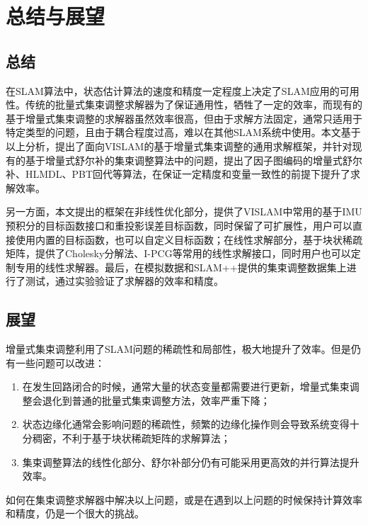 \chapter{总结与展望}\label{ch:con}

\section{总结}

在SLAM算法中，状态估计算法的速度和精度一定程度上决定了SLAM应用的可用性。传统的批量式集束调整求解器为了保证通用性，牺牲了一定的效率，而现有的基于增量式集束调整的求解器虽然效率很高，但由于求解方法固定，通常只适用于特定类型的问题，且由于耦合程度过高，难以在其他SLAM系统中使用。本文基于以上分析，提出了面向VISLAM的基于增量式集束调整的通用求解框架，并针对现有的基于增量式舒尔补的集束调整算法中的问题，提出了因子图编码的增量式舒尔补、HLMDL、PBT回代等算法，在保证一定精度和变量一致性的前提下提升了求解效率。

另一方面，本文提出的框架在非线性优化部分，提供了VISLAM中常用的基于IMU预积分的目标函数接口和重投影误差目标函数，同时保留了可扩展性，用户可以直接使用内置的目标函数，也可以自定义目标函数；在线性求解部分，基于块状稀疏矩阵，提供了Cholesky分解法、I-PCG等常用的线性求解接口，同时用户也可以定制专用的线性求解器。最后，在模拟数据和SLAM++提供的集束调整数据集上进行了测试，通过实验验证了求解器的效率和精度。

\section{展望}

增量式集束调整利用了SLAM问题的稀疏性和局部性，极大地提升了效率。但是仍有一些问题可以改进：
\begin{enumerate}
    \item 在发生回路闭合的时候，通常大量的状态变量都需要进行更新，增量式集束调整会退化到普通的批量式集束调整方法，效率严重下降；
    \item 状态边缘化通常会影响问题的稀疏性，频繁的边缘化操作则会导致系统变得十分稠密，不利于基于块状稀疏矩阵的求解算法；
    \item 集束调整算法的线性化部分、舒尔补部分仍有可能采用更高效的并行算法提升效率。
\end{enumerate}
如何在集束调整求解器中解决以上问题，或是在遇到以上问题的时候保持计算效率和精度，仍是一个很大的挑战。
